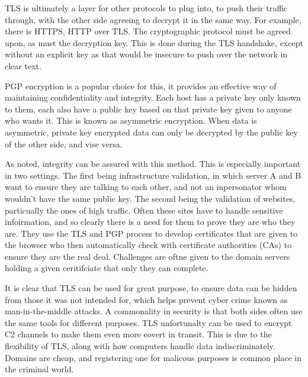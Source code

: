 TLS is ultimately a layer for other protocols to plug into, to push their traffic through, with the other side agreeing to decrypt it in the same way. For example, there is HTTPS, HTTP over TLS. The cryptographic protocol must be agreed upon, as must the decryption key. This is done during the TLS handshake, except without an explicit key as that would be insecure to push over the network in clear text. \citep{CloudflareTLS}

PGP encryption is a popular choice for this, it provides an effective way of maintaining confidentiality and integrity. Each host has a private key only known to them, each also have a public key based on that private key given to anyone who wants it. This is known as asymmetric encryption. When data is asymmetric, private key encrypted data can only be decrypted by the public key of the other side, and vise versa.  

As noted, integrity can be assured with this method. This is especially important in two settings. The first being infrastructure validation, in which server A and B want to ensure they are talking to each other, and not an inpersonator whom wouldn't have the same public key. The second being the validation of websites, particually the ones of high traffic. Often these sites have to handle sensitive infoirmation, and so clearly there is a need for them to prove they are who they are. They use the TLS and PGP process to develop certificates that are given to the browser who then automatically check with certificate authorities (CAs) to ensure they are the real deal. Challenges are oftne given to the domain servers holding a given ceritifciate that only they can complete.

It is clear that TLS can be used for great purpose, to ensure data can be hidden from those it was not intended for, which helps prevent cyber crime known as man-in-the-middle attacks. A commonality in security is that both sides often use the same tools for different purposes. TLS unfortunalty can be used to encrypt C2 
channels to make them even more covert in transit. This is due to the flexibility of TLS, along with how computers handle data indiscriminately. Domains are cheap, and registering one for malicous purposes is common place in the criminal world. \citep{TLS}




